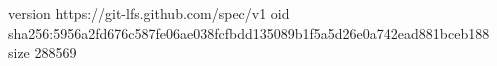 version https://git-lfs.github.com/spec/v1
oid sha256:5956a2fd676c587fe06ae038fcfbdd135089b1f5a5d26e0a742ead881bceb188
size 288569
